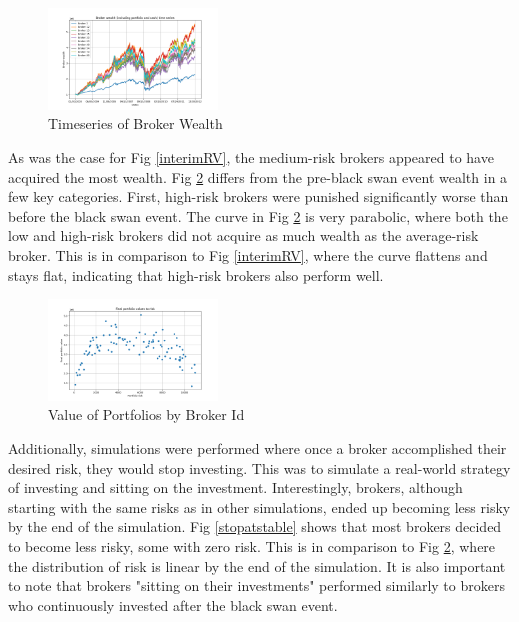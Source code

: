 \documentclass[letterpaper, 10 pt, proceedings]{ieeetran}
\begin{document}
	\begin{figure}[h]
		\centering
		\includegraphics[width=0.4\textwidth]{timeSeriesJoint.png}
		\caption{Timeseries of Broker Wealth}
		\label{ts_03-12}
	\end{figure}
	\FloatBarrier

	As was the case for Fig \ref{interimRV}, the medium-risk brokers appeared to have acquired the most wealth. Fig \ref{RV} differs from the pre-black swan event wealth in a few key categories. First, high-risk brokers were punished significantly worse than before the black swan event. The curve in Fig \ref{RV} is very parabolic, where both the low and high-risk brokers did not acquire as much wealth as the average-risk broker. This is in comparison to Fig \ref{interimRV}, where the curve flattens and stays flat, indicating that high-risk brokers also perform well.

	\begin{figure}[h]
		\centering
		\includegraphics[width=0.4\textwidth]{valueToRisk.png}
		\caption{Value of Portfolios by Broker Id}
		\label{RV}
	\end{figure}
	\FloatBarrier
	
	Additionally, simulations were performed where once a broker accomplished their desired risk, they would stop investing. This was to simulate a real-world strategy of investing and sitting on the investment. Interestingly, brokers, although starting with the same risks as in other simulations, ended up becoming less risky by the end of the simulation. Fig \ref{stopatstable} shows that most brokers decided to become less risky, some with zero risk. This is in comparison to Fig \ref{RV}, where the distribution of risk is linear by the end of the simulation. It is also important to note that brokers "sitting on their investments" performed similarly to brokers who continuously invested after the black swan event.
\end{document}
